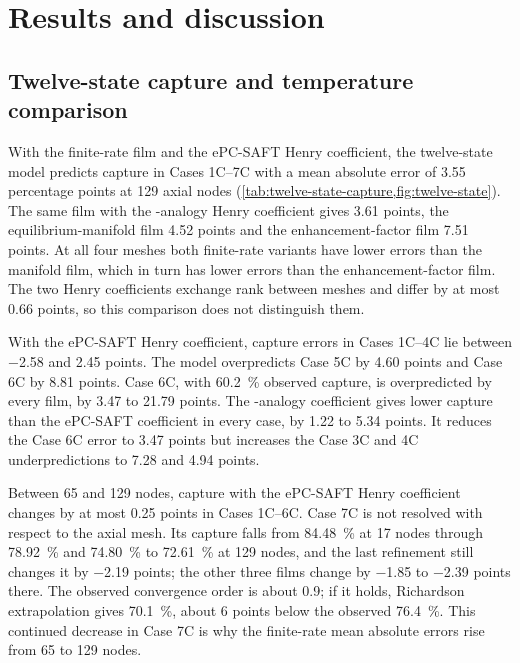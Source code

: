 \section{Results and discussion}\label{sec:results}
\subsection{Twelve-state capture and temperature comparison}\label{sec:twelve-state-results}
With the finite-rate film and the ePC-SAFT Henry coefficient, the twelve-state model predicts capture in Cases 1C--7C with a mean absolute error of \num{3.55} percentage points at 129 axial nodes (\cref{tab:twelve-state-capture,fig:twelve-state}).
The same film with the \NtwoO{}-analogy Henry coefficient gives \num{3.61} points, the equilibrium-manifold film \num{4.52} points and the enhancement-factor film \num{7.51} points.
At all four meshes both finite-rate variants have lower errors than the manifold film, which in turn has lower errors than the enhancement-factor film.
The two Henry coefficients exchange rank between meshes and differ by at most \num{0.66} points, so this comparison does not distinguish them.



With the ePC-SAFT Henry coefficient, capture errors in Cases 1C--4C lie between \num{-2.58} and \num{+2.45} points.
The model overpredicts Case 5C by \num{4.60} points and Case 6C by \num{8.81} points.
Case 6C, with \qty{60.2}{\percent} observed capture, is overpredicted by every film, by \num{3.47} to \num{21.79} points.
The \NtwoO{}-analogy coefficient gives lower capture than the ePC-SAFT coefficient in every case, by \num{1.22} to \num{5.34} points.
It reduces the Case 6C error to \num{3.47} points but increases the Case 3C and 4C underpredictions to \num{7.28} and \num{4.94} points.

Between 65 and 129 nodes, capture with the ePC-SAFT Henry coefficient changes by at most \num{0.25} points in Cases 1C--6C.
Case 7C is not resolved with respect to the axial mesh.
Its capture falls from \qty{84.48}{\percent} at 17 nodes through \qty{78.92}{\percent} and \qty{74.80}{\percent} to \qty{72.61}{\percent} at 129 nodes, and the last refinement still changes it by \num{-2.19} points; the other three films change by \num{-1.85} to \num{-2.39} points there.
The observed convergence order is about 0.9; if it holds, Richardson extrapolation gives \qty{70.1}{\percent}, about 6 points below the observed \qty{76.4}{\percent}.
This continued decrease in Case 7C is why the finite-rate mean absolute errors rise from 65 to 129 nodes.

